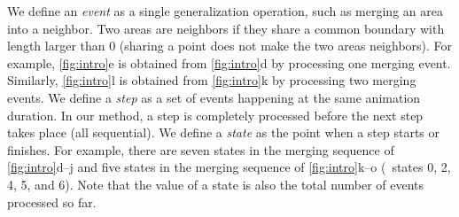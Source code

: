 \documentclass[twocolumn]{svjour3}          %
\begin{document}



We define an \emph{event} as a single generalization operation, 
such as merging an area into a neighbor.
Two areas are neighbors if they share a common boundary with length larger than 0
(sharing a point does not make the two areas neighbors).
For example, \fig\ref{fig:intro}e is obtained from 
\fig\ref{fig:intro}d by processing one merging event.
Similarly, \fig\ref{fig:intro}l is obtained from 
\fig\ref{fig:intro}k by processing two merging events.
We define a \emph{step} as 
a set of events happening at the same animation duration.
In our method, a step is completely processed 
before the next step takes place (all sequential).
We define a \emph{state} as the point when a step starts or finishes.
For example, there are seven states 
in the merging sequence of \figs\ref{fig:intro}d--j
and five states in the merging sequence of \figs\ref{fig:intro}k--o 
(\ie~states 0, 2, 4, 5, and 6).
Note that the value of a state is also 
the total number of events processed so far.
\end{document}
